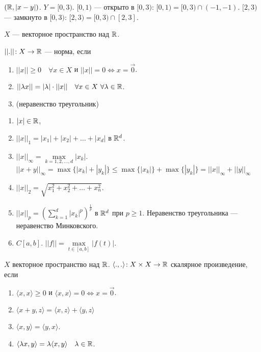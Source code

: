 \begin{example}
     $(\mathbb{R}, |x-y|)$.  $Y = [0, 3)$.  $[0, 1)$ --- открыто в  $[0, 3)$:  $[0, 1) = [0, 3) \cap (-1, -1)$.  $[2, 3)$ --- замкнуто в  $[0, 3)$:  $[2, 3) = [0, 3) \cap [2, 3]$.
\end{example}
 
\begin{definition}
     $X$ --- векторное пространство над  $\mathbb{R}$.

      $||.||\!: X \to \mathbb{R}$ --- норма, если
       \begin{enumerate}
           \item $||x|| \ge 0\quad \forall x \in X$ и $||x|| = 0 \iff x = \overrightarrow{0}$.
           \item  $||\lambda x|| = |\lambda| \cdot ||x||\quad \forall x \in X\ \forall \lambda \in \mathbb{R}$. 
           \item (неравенство треугольник)
      \end{enumerate}
\end{definition}
\begin{example}
     \begin{enumerate}
         \item $|x| \in \mathbb{R}$,
         \item  $||x||_1 = |x_1| + |x_2| + \ldots + |x_d|$ в $\mathbb{R}^d$.
         \item  $||x||_{\infty} = \max\limits_{k=1,2,\ldots, d} |x_k|$. $||x+y||_{\infty} = \max\{|x_k|+|y_k|\} \le \max\{|x_k|\} + \max\{|y_k|\} = ||x||_{\infty} + ||y||_{\infty}$
         \item $||x||_2 = \sqrt{x_1^2 + x_2^2 + \ldots + x_n^2}$.
         \item $||x||_p = \left(\sum\limits_{k=1}^d |x_k|^p\right)^{\frac{1}{p}}$ в $\mathbb{R}^d$ при  $p \ge 1$. Неравенство треугольника --- неравенство Минковского.
         \item $C[a, b]$.  $||f|| = \max\limits_{t \in [a, b]} |f(t)|$. 
     \end{enumerate}
\end{example}
\begin{definition}
    $X$ векторное пространство над  $\mathbb{R}$.  $\langle .,.\rangle\!: X \times X \to \mathbb{R}$ скалярное произведение, если
     \begin{enumerate}
         \item $\langle x, x \rangle \ge 0$ и $\langle x, x \rangle = 0 \iff x = \overrightarrow{0}$.
         \item  $\langle x+y, z\rangle = \langle x, z \rangle + \langle y, z \rangle$
         \item  $\langle x, y \rangle = \langle y, x \rangle$.
         \item  $\langle \lambda x, y \rangle = \lambda \langle x, y \rangle \quad \lambda \in \mathbb{R}$.
    \end{enumerate}
\end{definition}
